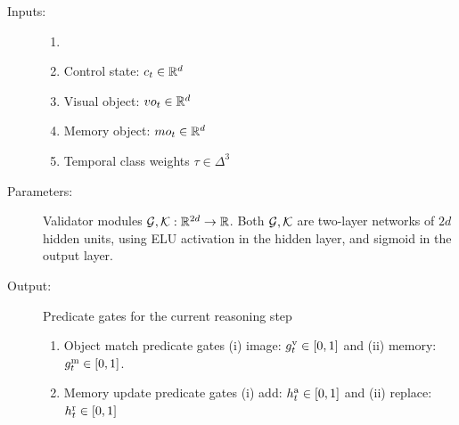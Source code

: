 

\begin{description}
	\item[Inputs:] 
	\begin{enumerate}
		\item[]
		\item Control state: $c_t \in \mathbb{R}^d$
		\item Visual object: $vo_t \in \mathbb{R}^d$
		\item Memory object: $mo_t \in \mathbb{R}^d$
		\item Temporal class weights $\tau \in \Delta^3$
	\end{enumerate}
	
	\item[Parameters:] Validator modules $\mathcal{G}, \mathcal{K}: \mathbb{R}^{2d} \to \mathbb{R}$.
	Both $\mathcal{G}, \mathcal{K}$ are two-layer networks of $2d$ hidden units,
	using ELU activation in the hidden layer, and sigmoid in the output layer.
	
	\item[Output:] Predicate gates for the current reasoning step
	\begin{enumerate}
		\item Object match predicate gates (i) image: $g^{\mathrm{v}}_t \in [0,1]$ and 
		(ii) memory: $g^{\mathrm{m}}_t \in [0,1]$.
		
		\item Memory update predicate gates (i) add: $h^{\mathrm{a}}_t \in [0,1]$ and
		(ii) replace: $h^{\mathrm{r}}_t \in [0,1]$
	\end{enumerate}
	
%		
%		
%		
\end{description}



